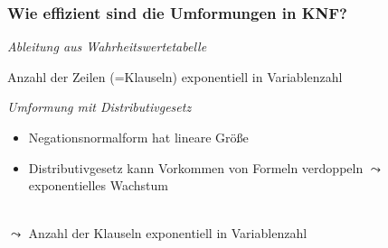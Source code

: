 \documentclass[aspectratio=1610,onlymath]{beamer}
\begin{document}
\begin{frame}\frametitle{Wie effizient sind die Umformungen in KNF?}

\emph{Ableitung aus Wahrheitswertetabelle}\medskip

Anzahl der Zeilen (=Klauseln) \alert{exponentiell} in Variablenzahl
\bigskip\pause

\emph{Umformung mit Distributivgesetz}%

\begin{itemize}
\item Negationsnormalform hat lineare Größe
\item Distributivgesetz kann Vorkommen von Formeln verdoppeln $\leadsto$ exponentielles Wachstum
\end{itemize}\pause

\\[1ex]
$\leadsto$ Anzahl der Klauseln \alert{exponentiell} in Variablenzahl

\end{frame}
\end{document}
